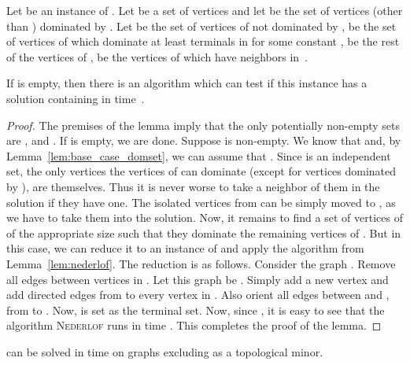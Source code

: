 \begin{lemma}\label{lem:base_case_nederlof_domset}
 Let  be an instance of {\ds}. 
Let  be a set of vertices and let  be the set of vertices (other than ) dominated by . Let  be the set of vertices of  not dominated by ,  be the set of vertices of  which dominate at least  terminals in  for some constant ,  be the rest of the vertices of ,  be the vertices of  which have neighbors in~.

If  is empty, then there is an algorithm which can test if this instance has a solution containing  in time~.
\end{lemma}

\begin{proof}
The premises of the lemma imply that the only potentially non-empty sets are ,  and . If  is empty, we are done. Suppose  is non-empty. 
We know that  and, by Lemma~\ref{lem:base_case_domset}, we can assume that . 
Since  is an independent set, the only vertices the vertices of  can dominate (except for vertices dominated by ), are themselves. Thus it is never worse to take a neighbor of them in the solution if they have one. The isolated vertices from  can be simply moved to , as we have to take them into the solution. Now, it remains to find a set of vertices of  of the appropriate size such that they dominate the remaining vertices of . But in this case, we can reduce it to an instance of {\dst} and apply the algorithm from Lemma~\ref{lem:nederlof}.
The reduction is as follows. Consider the graph . Remove all edges between vertices in . Let this graph be . Simply add a new vertex  and add directed edges from  to every vertex in . Also orient all edges between  and , from  to . Now,  is set as the terminal set. Now, since , it is easy to see that the algorithm \textsc{Nederlof} runs in time .
 This completes the proof of the lemma. 
\end{proof}









\begin{theorem}\label{thm:top_algo_ds}
 {\ds} can be solved in time  on graphs excluding  as a topological minor.
\end{theorem}



